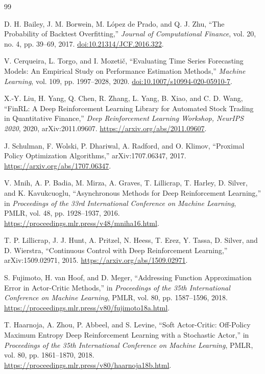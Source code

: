 \documentclass[12pt,a4paper,oneside]{book}
\begin{document}
\begin{thebibliography}{99}
\footnotesize
\raggedright
\setlength{\itemsep}{0.5\baselineskip}

D. H. Bailey, J. M. Borwein, M. L\'opez de Prado, and Q. J. Zhu, “The Probability of Backtest Overfitting,” \emph{Journal of Computational Finance}, vol. 20, no. 4, pp. 39--69, 2017. \href{https://doi.org/10.21314/JCF.2016.322}{doi:10.21314/JCF.2016.322}.

V. Cerqueira, L. Torgo, and I. Mozeti\v{c}, “Evaluating Time Series Forecasting Models: An Empirical Study on Performance Estimation Methods,” \emph{Machine Learning}, vol. 109, pp. 1997--2028, 2020. \href{https://doi.org/10.1007/s10994-020-05910-7}{doi:10.1007/s10994-020-05910-7}.

X.-Y. Liu, H. Yang, Q. Chen, R. Zhang, L. Yang, B. Xiao, and C. D. Wang, “FinRL: A Deep Reinforcement Learning Library for Automated Stock Trading in Quantitative Finance,” \emph{Deep Reinforcement Learning Workshop, NeurIPS 2020}, 2020, arXiv:2011.09607. \url{https://arxiv.org/abs/2011.09607}.

J. Schulman, F. Wolski, P. Dhariwal, A. Radford, and O. Klimov, “Proximal Policy Optimization Algorithms,” arXiv:1707.06347, 2017. \url{https://arxiv.org/abs/1707.06347}.

V. Mnih, A. P. Badia, M. Mirza, A. Graves, T. Lillicrap, T. Harley, D. Silver, and K. Kavukcuoglu, “Asynchronous Methods for Deep Reinforcement Learning,” in \emph{Proceedings of the 33rd International Conference on Machine Learning}, PMLR, vol. 48, pp. 1928--1937, 2016. \url{https://proceedings.mlr.press/v48/mniha16.html}.

T. P. Lillicrap, J. J. Hunt, A. Pritzel, N. Heess, T. Erez, Y. Tassa, D. Silver, and D. Wierstra, “Continuous Control with Deep Reinforcement Learning,” arXiv:1509.02971, 2015. \url{https://arxiv.org/abs/1509.02971}.

S. Fujimoto, H. van Hoof, and D. Meger, “Addressing Function Approximation Error in Actor-Critic Methods,” in \emph{Proceedings of the 35th International Conference on Machine Learning}, PMLR, vol. 80, pp. 1587--1596, 2018. \url{https://proceedings.mlr.press/v80/fujimoto18a.html}.

T. Haarnoja, A. Zhou, P. Abbeel, and S. Levine, “Soft Actor-Critic: Off-Policy Maximum Entropy Deep Reinforcement Learning with a Stochastic Actor,” in \emph{Proceedings of the 35th International Conference on Machine Learning}, PMLR, vol. 80, pp. 1861--1870, 2018. \url{https://proceedings.mlr.press/v80/haarnoja18b.html}.


\end{thebibliography}
\end{document}
